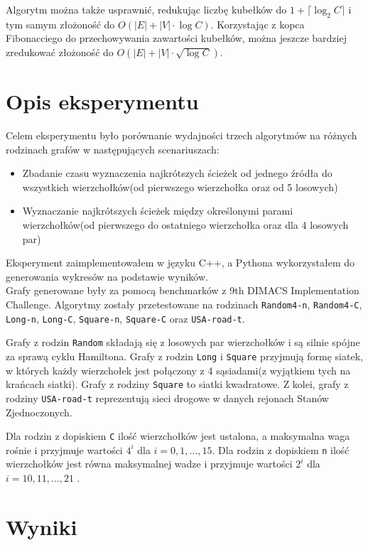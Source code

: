 \documentclass{article}
\begin{document}
Algorytm można także usprawnić, redukując liczbę kubełków do $1 + \lceil \log_2 C \rceil$ i tym samym złożoność do $O(|E| + |V| \cdot \log C)$.
Korzystając z kopca Fibonacciego do przechowywania zawartości kubełków, można jeszcze bardziej zredukować złożoność do $O(|E| + |V| \cdot \sqrt{\log C})$.

\section{Opis eksperymentu}
Celem eksperymentu było porównanie wydajności trzech algorytmów na różnych rodzinach grafów w następujących scenariuszach:
\begin{itemize}
    \item Zbadanie czasu wyznaczenia najkrótszych ścieżek od jednego źródła do wszystkich wierzchołków(od pierwszego wierzchołka oraz od 5 losowych)
    \item Wyznaczanie najkrótszych ścieżek między określonymi parami wierzchołków(od pierwszego do ostatniego wierzchołka oraz dla 4 losowych par)
\end{itemize}

\noindent Eksperyment zaimplementowałem w języku C++, a Pythona wykorzystałem do generowania wykresów na podstawie wyników. \\

\noindent Grafy generowane były za pomocą benchmarków z 9th DIMACS Implementation Challenge.
Algorytmy zostały przetestowane na rodzinach \texttt{Random4-n}, \texttt{Random4-C}, \texttt{Long-n}, \texttt{Long-C}, \texttt{Square-n}, \texttt{Square-C} oraz  \texttt{USA-road-t}.

Grafy z rodzin \texttt{Random} składają się z losowych par wierzchołków i są silnie spójne za sprawą cyklu Hamiltona.
Grafy z rodzin \texttt{Long} i \texttt{Square} przyjmują formę siatek, w których każdy wierzchołek jest połączony z 4 sąsiadami(z wyjątkiem tych na krańcach siatki).
Grafy z rodziny \texttt{Square} to siatki kwadratowe.
Z kolei, grafy z rodziny \texttt{USA-road-t} reprezentują sieci drogowe w danych rejonach Stanów Zjednoczonych.

Dla rodzin z dopiskiem \texttt{C} ilość wierzchołków jest ustalona, a maksymalna waga rośnie i przyjmuje wartości $4^i$ dla $i=0, 1, ..., 15$.
Dla rodzin z dopiskiem \texttt{n} ilość wierzchołków jest równa maksymalnej wadze i przyjmuje wartości $2^i$ dla $i=10, 11, ..., 21$ .


\section{Wyniki}
\end{document}
